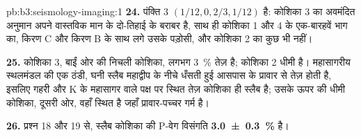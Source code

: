\begin{solution}{pb:b3:seismology-imaging:1}
\textbf{24.} पंक्ति 3 $(1/12, 0, 2/3, 1/12)$ है: कोशिका 3 का अवमंदित अनुमान
अपने वास्तविक मान के दो-तिहाई के बराबर है, साथ ही कोशिका 1 और 4 के एक-बारहवें भाग का,
किरण C और किरण B के साथ लगे उसके पड़ोसी, और कोशिका 2 का कुछ भी नहीं।

\textbf{25.} कोशिका 3, बाईं ओर की निचली कोशिका, लगभग
\qty{3}{\percent} तेज़ है; कोशिका 2 धीमी है। महासागरीय स्थलमंडल की एक ठंडी, घनी स्लैब
महाद्वीप के नीचे धँसती हुई आसपास के प्रावार से तेज़ होती है, इसलिए
गहरी और K के महासागर वाले पक्ष पर स्थित तेज़ कोशिका ही स्लैब है; उसके ऊपर की
धीमी कोशिका, दूसरी ओर, वहाँ स्थित है जहाँ प्रावार-पच्चर गर्म है।

\textbf{26.} प्रश्न 18 और 19 से, स्लैब कोशिका की P-वेग विसंगति
\textbf{\qty[text-series-to-math=true, uncertainty-mode=separate]{3.0 \pm 0.3}{\percent}} है।
\end{solution}
